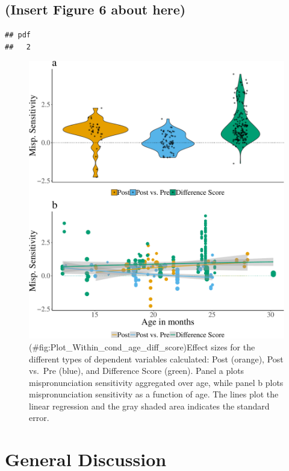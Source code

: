 \documentclass[man]{apa6}
\theoremstyle{definition}
\theoremstyle{definition}
\theoremstyle{definition}
\theoremstyle{remark}
\begin{document}
\subsection{(Insert Figure 6 about
here)}\label{insert-figure-6-about-here}

\begin{verbatim}
## pdf 
##   2
\end{verbatim}

\begin{figure}
\centering
\includegraphics{Paper_Analyses_files/figure-latex/Plot_Within_cond_age_diff_score-1.pdf}
\caption{(\#fig:Plot\_Within\_cond\_age\_diff\_score)Effect sizes for
the different types of dependent variables calculated: Post (orange),
Post vs.~Pre (blue), and Difference Score (green). Panel a plots
mispronunciation sensitivity aggregated over age, while panel b plots
mispronunciation sensitivity as a function of age. The lines plot the
linear regression and the gray shaded area indicates the standard
error.}
\end{figure}

\section{General Discussion}\label{general-discussion}
\end{document}
